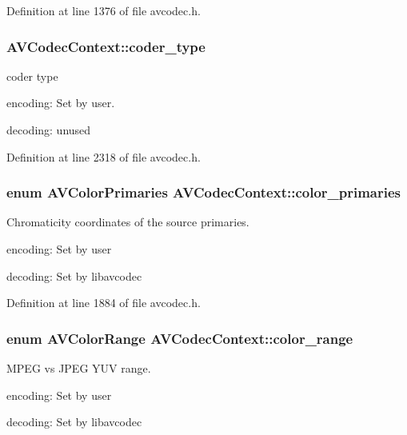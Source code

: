 Definition at line 1376 of file avcodec.\+h.

\subsubsection[{\texorpdfstring{coder\+\_\+type}{coder_type}}]{ A\+V\+Codec\+Context\+::coder\+\_\+type}\hypertarget{struct_a_v_codec_context_ad5d81542c08bf97f64a59a028c319995}{}\label{struct_a_v_codec_context_ad5d81542c08bf97f64a59a028c319995}
coder type
\begin{DoxyItemize}
\item encoding\+: Set by user.
\item decoding\+: unused 
\end{DoxyItemize}

Definition at line 2318 of file avcodec.\+h.

\subsubsection[{\texorpdfstring{color\+\_\+primaries}{color_primaries}}]{\setlength{\rightskip}{0pt plus 5cm}enum {\bf A\+V\+Color\+Primaries} A\+V\+Codec\+Context\+::color\+\_\+primaries}\hypertarget{struct_a_v_codec_context_a3a41b3e5bde23b877799f6e72dac8ef3}{}\label{struct_a_v_codec_context_a3a41b3e5bde23b877799f6e72dac8ef3}
Chromaticity coordinates of the source primaries.
\begin{DoxyItemize}
\item encoding\+: Set by user
\item decoding\+: Set by libavcodec 
\end{DoxyItemize}

Definition at line 1884 of file avcodec.\+h.

\subsubsection[{\texorpdfstring{color\+\_\+range}{color_range}}]{\setlength{\rightskip}{0pt plus 5cm}enum {\bf A\+V\+Color\+Range} A\+V\+Codec\+Context\+::color\+\_\+range}\hypertarget{struct_a_v_codec_context_a255bf7100a4ba6dcb6ee5d87740a4f35}{}\label{struct_a_v_codec_context_a255bf7100a4ba6dcb6ee5d87740a4f35}
M\+P\+EG vs J\+P\+EG Y\+UV range.
\begin{DoxyItemize}
\item encoding\+: Set by user
\item decoding\+: Set by libavcodec 
\end{DoxyItemize}

